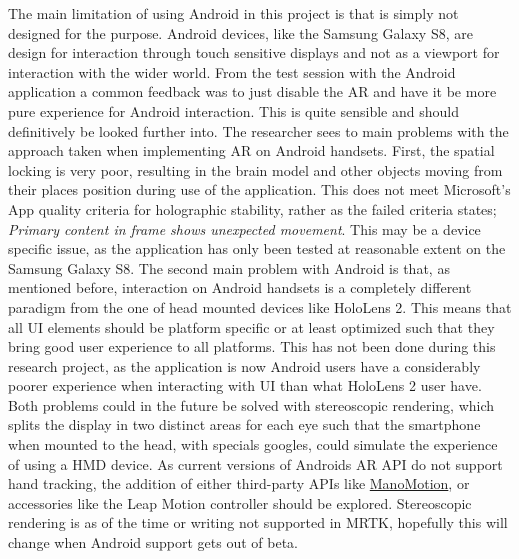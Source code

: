 The main limitation of using Android in this project is that is simply not designed for the purpose. Android devices, like the Samsung Galaxy S8, are design for interaction through touch sensitive displays and not as a viewport for interaction with the wider world. From the test session with the Android application a common feedback was to just disable the AR and have it be more pure experience for Android interaction. This is quite sensible and should definitively be looked further into. The researcher sees to main problems with the approach taken when implementing AR on Android handsets. First, the spatial locking is very poor, resulting in the brain model and other objects moving from their places position during use of the application. This does not meet Microsoft's App quality criteria for holographic stability, rather as the failed criteria states; \textit{Primary content in frame shows unexpected movement}. This may be a device specific issue, as the application has only been tested at reasonable extent on the Samsung Galaxy S8.
The second main problem with Android is that, as mentioned before, interaction on Android handsets is a completely different paradigm from the one of head mounted devices like  HoloLens 2. This means that all UI elements should be platform specific or at least optimized such that they bring good user experience to all platforms. This has not been done during this research project, as the application is now Android users have a considerably poorer experience when interacting with UI than what HoloLens 2 user have. 
Both problems could in the future be solved with stereoscopic rendering, which splits the display in two distinct areas for each eye such that the smartphone when mounted to the head, with specials googles, could simulate the experience of using a HMD device. As current versions of Androids AR API do not support hand tracking, the addition of either third-party APIs like \href{https://www.manomotion.com}{ManoMotion}, or accessories like the Leap Motion controller should be explored. Stereoscopic rendering is as of the time or writing not supported in MRTK, hopefully this will change when Android support gets out of beta. 


